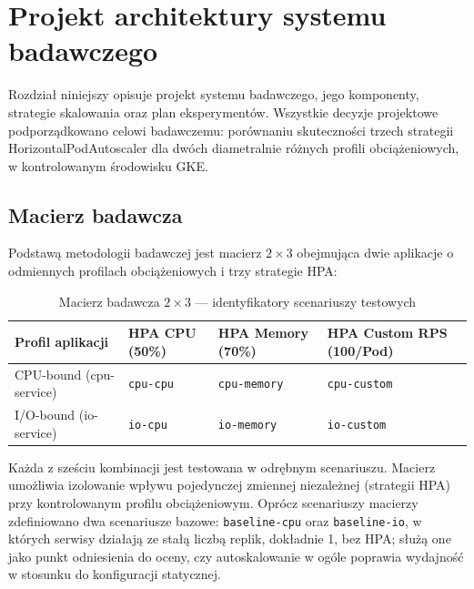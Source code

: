 \chapter{Projekt architektury systemu badawczego}

Rozdział niniejszy opisuje projekt systemu badawczego, jego komponenty, strategie skalowania oraz plan eksperymentów. Wszystkie decyzje projektowe podporządkowano celowi badawczemu: porównaniu skuteczności trzech strategii HorizontalPodAutoscaler dla dwóch diametralnie różnych profili obciążeniowych, w kontrolowanym środowisku GKE.

\section{Macierz badawcza}

Podstawą metodologii badawczej jest macierz $2 \times 3$ obejmująca dwie aplikacje o odmiennych profilach obciążeniowych i trzy strategie HPA:

\begin{table}[H]
  \centering
  \begin{tabularx}{\textwidth}{|l|X|X|X|}
    \hline
    \textbf{Profil aplikacji} & \textbf{HPA CPU (50\%)} & \textbf{HPA Memory (70\%)} & \textbf{HPA Custom RPS (100/Pod)} \\
    \hline
    CPU-bound (cpu-service) & \texttt{cpu-cpu} & \texttt{cpu-memory} & \texttt{cpu-custom} \\
    \hline
    I/O-bound (io-service) & \texttt{io-cpu} & \texttt{io-memory} & \texttt{io-custom} \\
    \hline
  \end{tabularx}
  \caption{Macierz badawcza $2 \times 3$ — identyfikatory scenariuszy testowych}
  \label{tab:research-matrix}
\end{table}

Każda z sześciu kombinacji jest testowana w odrębnym scenariuszu. Macierz umożliwia izolowanie wpływu pojedynczej zmiennej niezależnej (strategii HPA) przy kontrolowanym profilu obciążeniowym. Oprócz scenariuszy macierzy zdefiniowano dwa scenariusze bazowe: \texttt{baseline-cpu} oraz \texttt{baseline-io}, w których serwisy działają ze stałą liczbą replik, dokładnie 1, bez HPA; służą one jako punkt odniesienia do oceny, czy autoskalowanie w ogóle poprawia wydajność w stosunku do konfiguracji statycznej.

